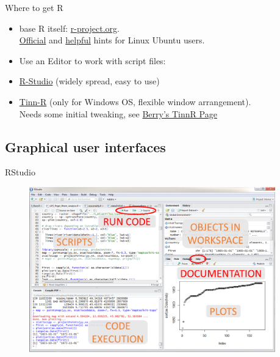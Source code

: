 \documentclass[xcolor=table,       handout,    xcolor=dvipsnames]{beamer}\usepackage[]{graphicx}\usepackage[]{color}
\begin{document}
\begin{frame}{Where to get R}
\begin{itemize}%
  \item base R itself: \href{https://cloud.r-project.org/}{r-project.org}.\\
        \href{https://cran.r-project.org/bin/linux/ubuntu/README.html}{Official} and \href{https://www.r-bloggers.com/how-to-install-r-on-linux-ubuntu-16-04-xenial-xerus/}{helpful} hints for Linux Ubuntu users.
  \item Use an Editor to work with script files:
  \item \href{https://www.rstudio.com/products/rstudio/\#Desktop}{R-Studio} (widely spread, easy to use)
  \item \href{http://sourceforge.net/projects/tinn-r/}{Tinn-R} (only for Windows OS, flexible window arrangement).\\
         Needs some initial tweaking, see \href{https://rclickhandbuch.wordpress.com/install-r/tinn-r_english}{Berry's TinnR Page} %
\end{itemize}
\label{installR}
\end{frame}

\subsection{Graphical user interfaces}



\begin{frame}{RStudio}
  \begin{figure}
  \includegraphics[width=0.95\textwidth]{./externalfig/Rstudio.png}
  \end{figure}
\end{frame}
\end{document}
